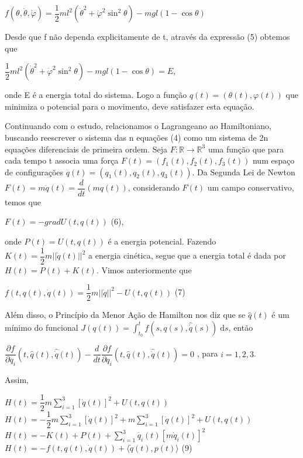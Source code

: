 \documentclass[12pt, a4paper]{article}
\begin{document}
\begin{center}
$ f(\theta, \dot \theta, \dot \varphi) =  \dfrac{1}{2}ml^2({\dot \theta}^2 + {\dot \varphi}^2 \sin^2 \theta) - mgl(1-\cos\theta)$
\end{center}

Desde que f não dependa explicitamente de t, através da expressão (5) obtemos que

\begin{center}
$\dfrac{1}{2}ml^2({\dot \theta}^2 + {\dot \varphi}^2 \sin^2 \theta) - mgl(1-\cos\theta) = E$,
\end{center}

onde E é a energia total do sistema. Logo a função $q(t)=(\theta(t),\varphi(t))$ que minimiza o potencial para o movimento, deve satisfazer esta equação.

Continuando com o estudo, relacionamos o Lagrangeano ao Hamiltoniano, buscando reescrever o sistema das n equações (4) como um sistema de 2n equações diferenciais de primeira ordem.
Seja $F: \mathbb{R} \to \mathbb{R}^3$ uma função que para cada tempo t associa uma força $F(t)=(f_1(t),f_2(t),f_3(t))$ num espaço de configurações $q(t)=(q_1(t),q_2(t),q_3(t))$. Da Segunda Lei de Newton $F(t)=m\ddot q(t)=  \dfrac{d}{dt}(mq(t))$, considerando $F(t)$ um campo conservativo, temos que

\begin{center}
$ F(t) = -grad U(t, q(t)) $ (6),
\end{center}

onde $P(t) = U(t,q(t))$ é a energia potencial. Fazendo $K(t)= \dfrac{1}{2} m||\dot{q}(t)||^2$ a energia cinética, segue que a energia total é dada por $H(t)=P(t)+K(t)$.
Vimos anteriormente que 

\begin{center}
$ f(t, q(t), \dot{q}(t)) = \dfrac{1}{2} m||\dot{q}||^2 -U(t, q(t)) $ (7)
\end{center}

Além disso, o Princípio da Menor Ação de Hamilton nos diz que se $\hat{q}(t)$ é um mínimo do funcional $J(q(t))= \int_{t_0}^t f(s,q(s),\hat{\dot{q}}(s)) \; \mathrm{d}s$, então 

\begin{center}
$ \dfrac{\partial f}{\partial q_i}(t, \hat{q}(t), \hat{\dot{q}}(t)) - \dfrac{d}{dt} \dfrac{\partial f}{\partial q_i}(t, \hat{q}(t), \hat{\dot{q}}(t)) = 0$ , para $i = 1,2,3$.
\end{center}

Assim, 
\begin{center}
$H(t) = \dfrac{1}{2} m \sum_{i=1}^{3} [\dot{q}(t)]^2 + U(t,q(t))$\\
$H(t) = -\dfrac{1}{2} m \sum_{i=1}^{3} [\dot{q}(t)]^2 + m \sum_{i=1}^{3} [\dot{q}(t)]^2 + U(t,q(t))$\\
$H(t) = -K(t) + P(t) + \sum_{i=1}^{3} \dot{q_i}(t)[m\dot{q}_i(t)]^2 $\\
$H(t) = -f(t, q(t), \dot{q}(t)) + \langle \dot{q}(t), p(t) \rangle$ (9)
\end{center}
\end{document}
